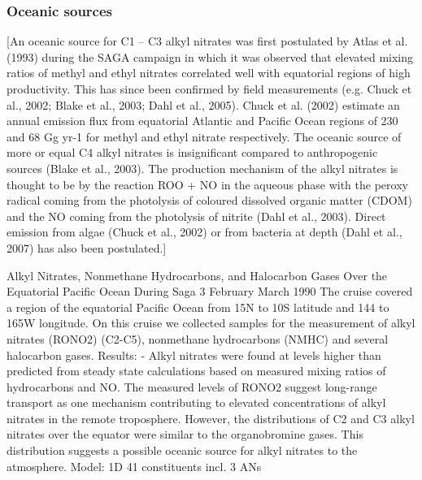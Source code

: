 \documentclass[11pt,a4paper]{article}
\begin{document}
\subsubsection*{Oceanic sources}
\citep{Newland2013}
[An oceanic source for C1 – C3 alkyl nitrates was first postulated by Atlas et al. (1993) during the SAGA campaign in which it was observed that elevated mixing ratios of methyl and ethyl nitrates correlated well with equatorial regions of high productivity. This has since been confirmed by field measurements (e.g. Chuck et al., 2002; Blake et al., 2003; Dahl et al., 2005). Chuck et al. (2002) estimate an annual emission flux from equatorial Atlantic and Pacific Ocean regions of 230 and 68 Gg yr-1 for methyl and ethyl nitrate respectively. The oceanic source of more or equal C4 alkyl nitrates is insignificant compared to anthropogenic sources (Blake et al., 2003).
The production mechanism of the alkyl nitrates is thought to be by the reaction ROO + NO in the aqueous phase with the peroxy radical coming from the photolysis of coloured dissolved organic matter (CDOM) and the NO coming from the photolysis of nitrite (Dahl et al., 2003). Direct emission from algae (Chuck et al., 2002) or from bacteria at depth (Dahl et al., 2007) has also been postulated.]

\citep{Atlas1993}
Alkyl Nitrates, Nonmethane Hydrocarbons, and Halocarbon Gases Over the Equatorial Pacific Ocean During Saga 3
February March 1990
The cruise covered a region of the equatorial Pacific Ocean from 15N to 10S latitude and 144 to 165W longitude. On this cruise we collected samples for the measurement of alkyl nitrates (RONO2) (C2-C5), nonmethane hydrocarbons (NMHC) and several halocarbon gases.
Results:
- Alkyl nitrates were found at levels higher than predicted from steady state calculations based on measured mixing ratios of hydrocarbons and NO. The measured levels of RONO2 suggest long-range transport as one mechanism contributing to elevated concentrations of alkyl nitrates in the remote troposphere. However, the distributions of C2 and C3 alkyl nitrates over the equator were  similar to the organobromine gases. This distribution suggests
a possible oceanic source for alkyl nitrates to the atmosphere.
Model: 1D 41 constituents incl. 3 ANs
\end{document}
